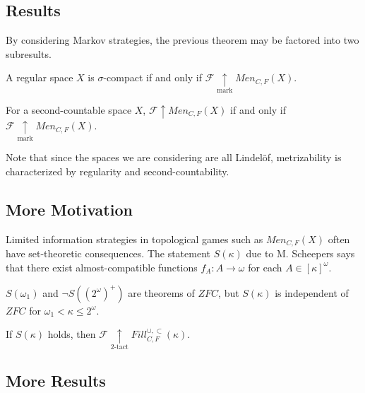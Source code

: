 \documentclass{beamer}
\theoremstyle{definition}
\newcommand{\win}{\uparrow}
\newcommand{\markwin}{\underset{\text{mark}}{\uparrow}}
\newcommand{\ktactwin}[1]{\underset{#1\text{-tact}}{\uparrow}}
\newcommand{\menGame}[1]{Men_{C,F}\left({#1}\right)}
\newcommand{\cloFillStrictGame}[1]{Fill^{\cup,\subset}_{C,F}\left({#1}\right)}
\newcommand{\<}{\langle}
\renewcommand{\>}{\rangle}
\newcommand{\alcompS}[1]{S(#1)}
\newcommand{\pl}[1]{\mathscr{#1}}
\begin{document}
\subsection{Results}

\begin{frame}
  By considering Markov strategies, the previous theorem may be factored
  into two subresults.

  \begin{theorem}
    A regular space $X$ is $\sigma$-compact if and only if
    $\pl F\markwin\menGame{X}$.
  \end{theorem}
  \begin{theorem}
    For a second-countable space $X$, $\pl F\win\menGame{X}$ if and only if
    $\pl F\markwin\menGame{X}$.
  \end{theorem}

  Note that since the spaces we are considering are all Lindel\"of,
  metrizability is characterized by regularity and second-countability.
\end{frame}

\subsection{More Motivation}

\begin{frame}
  Limited information strategies in topological games such as
  $\menGame{X}$ often have set-theoretic
  consequences. The statement $\alcompS\kappa$ due to M. Scheepers
  \cite{MR1129143} says that there exist
  almost-compatible functions $f_A:A\to\omega$ for each $A\in[\kappa]^\omega$.

  \begin{theorem}
    $\alcompS{\omega_1}$ and $\neg\alcompS{(2^\omega)^+}$ are theorems
    of $ZFC$, but $\alcompS\kappa$ is independent of $ZFC$ for
    $\omega_1<\kappa\leq 2^\omega$.
  \end{theorem}

  \begin{theorem}
    If $\alcompS{\kappa}$ holds, then
    $\pl F\ktactwin2 \cloFillStrictGame{\kappa}$.
  \end{theorem}
\end{frame}

\subsection{More Results}
\end{document}
